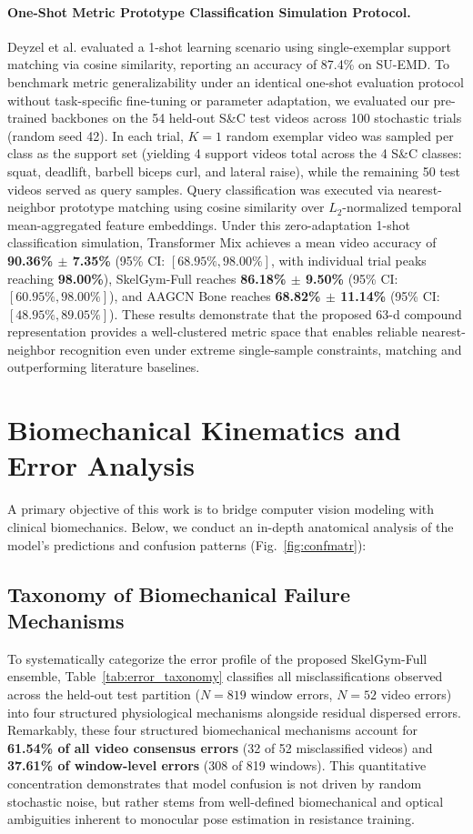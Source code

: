 \documentclass[runningheads]{llncs}
\begin{document}
\paragraph{One-Shot Metric Prototype Classification Simulation Protocol.}
Deyzel et al. \cite{deyzel2023} evaluated a 1-shot learning scenario using single-exemplar support matching via cosine similarity, reporting an accuracy of 87.4\% on SU-EMD. To benchmark metric generalizability under an identical one-shot evaluation protocol without task-specific fine-tuning or parameter adaptation, we evaluated our pre-trained backbones on the 54 held-out S\&C test videos across 100 stochastic trials (random seed 42). In each trial, $K=1$ random exemplar video was sampled per class as the support set (yielding 4 support videos total across the 4 S\&C classes: squat, deadlift, barbell biceps curl, and lateral raise), while the remaining 50 test videos served as query samples. Query classification was executed via nearest-neighbor prototype matching using cosine similarity over $L_2$-normalized temporal mean-aggregated feature embeddings. Under this zero-adaptation 1-shot classification simulation, Transformer Mix achieves a mean video accuracy of \textbf{90.36\% $\pm$ 7.35\%} (95\% CI: $[68.95\%, 98.00\%]$, with individual trial peaks reaching \textbf{98.00\%}), SkelGym-Full reaches \textbf{86.18\% $\pm$ 9.50\%} (95\% CI: $[60.95\%, 98.00\%]$), and AAGCN Bone reaches \textbf{68.82\% $\pm$ 11.14\%} (95\% CI: $[48.95\%, 89.05\%]$). These results demonstrate that the proposed 63-d compound representation provides a well-clustered metric space that enables reliable nearest-neighbor recognition even under extreme single-sample constraints, matching and outperforming literature baselines.

\section{Biomechanical Kinematics and Error Analysis}
\label{sec:biomechanical_analysis}

A primary objective of this work is to bridge computer vision modeling with clinical biomechanics. Below, we conduct an in-depth anatomical analysis of the model's predictions and confusion patterns (Fig.~\ref{fig:confmatr}):

\subsection{Taxonomy of Biomechanical Failure Mechanisms}
To systematically categorize the error profile of the proposed SkelGym-Full ensemble, Table~\ref{tab:error_taxonomy} classifies all misclassifications observed across the held-out test partition ($N=819$ window errors, $N=52$ video errors) into four structured physiological mechanisms alongside residual dispersed errors. Remarkably, these four structured biomechanical mechanisms account for \textbf{61.54\% of all video consensus errors} (32 of 52 misclassified videos) and \textbf{37.61\% of window-level errors} (308 of 819 windows). This quantitative concentration demonstrates that model confusion is not driven by random stochastic noise, but rather stems from well-defined biomechanical and optical ambiguities inherent to monocular pose estimation in resistance training.
\end{document}
